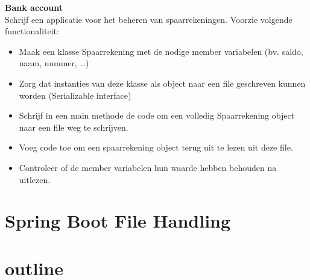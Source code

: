 \begin{oefening}
\textbf{Bank account}\\

Schrijf een applicatie voor het beheren van spaarrekeningen.
Voorzie volgende functionaliteit:
\begin{itemize}
\item Maak een klasse Spaarrekening met de nodige member variabelen (bv. saldo,
naam, nummer, …)
\item Zorg dat instanties van deze klasse als object naar een file geschreven kunnen
worden (Serializable interface)
\item Schrijf in een main methode de code om een volledig Spaarrekening object
naar een file weg te schrijven.
\item Voeg code toe om een spaarrekening object terug uit te lezen uit deze file.
\item Controleer of de member variabelen hun waarde hebben behouden na uitlezen.
\end{itemize}
\end{oefening}


\section{Spring Boot File Handling}





\section{outline}

